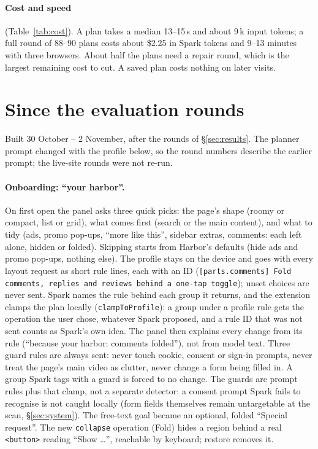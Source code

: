 \documentclass[10pt,a4paper]{article}
\begin{document}
\paragraph{Cost and speed} (Table~\ref{tab:cost}). A plan takes a median 13--15\,s and about 9\,k input tokens; a full round of 88--90 plans costs about \$2.25 in Spark tokens and 9--13 minutes with three browsers. About half the plans need a repair round, which is the largest remaining cost to cut. A saved plan costs nothing on later visits.

\section{Since the evaluation rounds}\label{sec:since}
Built 30 October -- 2 November, after the rounds of \S\ref{sec:results}. The planner prompt changed with the profile below, so the round numbers describe the earlier prompt; the live-site rounds were not re-run.

\paragraph{Onboarding: ``your harbor''.} On first open the panel asks three quick picks: the page's shape (roomy or compact, list or grid), what comes first (search or the main content), and what to tidy (ads, promo pop-ups, ``more like this'', sidebar extras, comments: each left alone, hidden or folded). Skipping starts from Harbor's defaults (hide ads and promo pop-ups, nothing else). The profile stays on the device and goes with every layout request as short rule lines, each with an ID (\texttt{[parts.comments] Fold comments, replies and reviews behind a one-tap toggle}); unset choices are never sent. Spark names the rule behind each group it returns, and the extension clamps the plan locally (\texttt{clampToProfile}): a group under a profile rule gets the operation the user chose, whatever Spark proposed, and a rule ID that was not sent counts as Spark's own idea. The panel then explains every change from its rule (``because your harbor: comments folded''), not from model text. Three guard rules are always sent: never touch cookie, consent or sign-in prompts, never treat the page's main video as clutter, never change a form being filled in. A group Spark tags with a guard is forced to no change. The guards are prompt rules plus that clamp, not a separate detector: a consent prompt Spark fails to recognise is not caught locally (form fields themselves remain untargetable at the scan, \S\ref{sec:system}). The free-text goal became an optional, folded ``Special request''. The new \texttt{collapse} operation (Fold) hides a region behind a real \texttt{<button>} reading ``Show \ldots'', reachable by keyboard; restore removes it.
\end{document}
